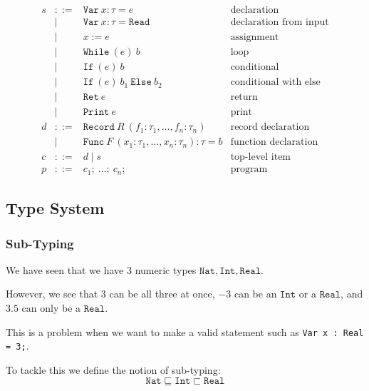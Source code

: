 \documentclass[11pt,a4paper]{article}
\newcommand{\kw}[1]{\mathtt{#1}}                     %
\begin{document}
\[\begin{array}{rcll}
  s      & ::=  & \kw{Var}\ x : \tau = e                  & \text{declaration} \\
 		 & \mid & \kw{Var}\ x : \tau = \kw{Read} & \text{declaration from input} \\
         & \mid & x := e                                  & \text{assignment} \\
         & \mid & \kw{While}\ (e)\ b                      & \text{loop} \\
         & \mid & \kw{If}\ (e)\ b                         & \text{conditional} \\
         & \mid & \kw{If}\ (e)\ b_1\ \kw{Else}\ b_2       & \text{conditional with else} \\
         & \mid & \kw{Ret}\ e                             & \text{return} \\
         & \mid & \kw{Print}\ e                           & \text{print} \\[4pt]
  d      & ::=  & \kw{Record}\ R\ (f_1 : \tau_1, \dots, f_n : \tau_n)
                                                          & \text{record declaration} \\
         & \mid & \kw{Func}\ F\ (x_1 : \tau_1, \dots, x_n : \tau_n) : \tau = b
                                                          & \text{function declaration} \\[4pt]
  c      & ::=  & d \mid s                                & \text{top-level item} \\
  p      & ::=  & c_1;\ \dots;\ c_n;                      & \text{program}
\end{array}
\]


\subsection{Type System}
\subsubsection{Sub-Typing}

We have seen that we have 3 numeric types $\kw{Nat},\kw{Int},\kw{Real}$.

However, we see that $3$ can be all three at once, $-3$ can be an $\kw{Int}$ or a $\kw{Real}$, and $3.5$ can only be a $\kw{Real}$.

This is a problem when we want to make a valid statement such as \lstinline|Var x : Real = 3;|.

To tackle this we define the notion of sub-typing:
$$
\kw{Nat}\sqsubseteq\kw{Int}\sqsubset\kw{Real}
$$
\end{document}
